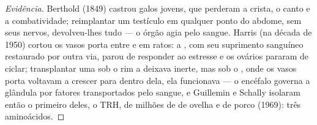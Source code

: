 \begin{proof}[Evidência]
Berthold (1849) castrou galos jovens, que perderam a crista, o canto e a
combatividade; reimplantar um testículo em qualquer ponto do abdome, sem
seus nervos, devolveu-lhes tudo --- o órgão agia pelo sangue. Harris (na
década de 1950) cortou os vasos porta entre  e  em
ratos: a , com seu suprimento sanguíneo restaurado por outra
via, parou de responder ao estresse e os ovários pararam de ciclar;
transplantar uma  sob o rim a deixava inerte, mas sob o
, onde os vasos porta voltavam a crescer para dentro dela, ela
funcionava --- o encéfalo governa a glândula por fatores transportados
pelo sangue, e Guillemin e Schally isolaram então o primeiro deles, o
TRH, de milhões de  de ovelha e de porco (1969): três
aminoácidos.
\end{proof}

